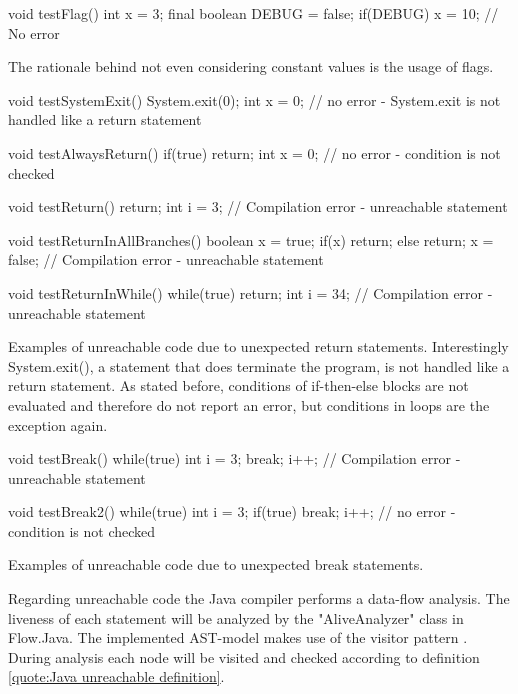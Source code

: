 \begin{program}[h!]
	\begin{JavaCode}
void testFlag() {
	int x = 3;
	final boolean DEBUG = false;
	if(DEBUG) x = 10; // No error
}\end{JavaCode}
	\caption{The rationale behind not even considering constant values is the usage of flags.}
	\label{code:Java flags}
\end{program}

\begin{program}[h!]
	\begin{JavaCode}
void testSystemExit() {
	System.exit(0);
	int x = 0; // no error - System.exit is not handled like a return statement
}

void testAlwaysReturn() {
	if(true) return;
	int x = 0; // no error - condition is not checked
}

void testReturn() {
	return;
	int i = 3; // Compilation error - unreachable statement
}

void testReturnInAllBranches() {
	boolean x = true;
	if(x) return;
	else return;
	x = false; // Compilation error - unreachable statement
}

void testReturnInWhile() {
	while(true) {
		return;
	}
	int i = 34; // Compilation error - unreachable statement
}\end{JavaCode}
	\caption{Examples of unreachable code due to unexpected return statements. Interestingly System.exit(), a statement that does terminate the program, is not handled like a return statement. As stated before, conditions of if-then-else blocks are not evaluated and therefore do not report an error, but conditions in loops are the exception again. }
	\label{code:Java unexpected return}
\end{program}

\begin{program}[h!]
	\begin{JavaCode}
void testBreak() {
	while(true) {
		int i = 3;
		break; 
		i++; // Compilation error - unreachable statement
	}
}

void testBreak2() {
	while(true) {
		int i = 3;
		if(true) break; 
		i++; // no error - condition is not checked
	}
}\end{JavaCode}
	\caption{Examples of unreachable code due to unexpected break statements.}
	\label{code:Java unexpected break}
\end{program}

Regarding unreachable code the Java compiler performs a data-flow analysis. The liveness of each statement will be analyzed by the "AliveAnalyzer" class in Flow.Java. The implemented AST-model makes use of the visitor pattern \cite{gammaDesignPatternsElements}. During analysis each node will be visited and checked according to definition \ref{quote:Java unreachable definition}.


